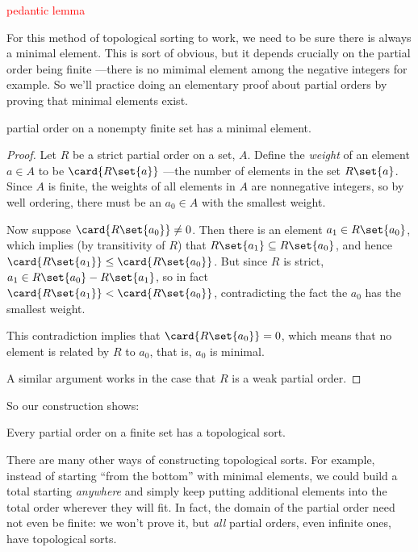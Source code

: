 \begin{editingnotes}
\textcolor{red}{pedantic lemma}

For this method of topological sorting to work, we need to be sure
there is always a minimal element.  This is sort of obvious, but it
depends crucially on the partial order being finite ---there is no
mimimal element among the negative integers for example.  So we'll
practice doing an elementary proof about partial orders by proving
that minimal elements exist.

\begin{lemma}\label{finmin}
   partial order on a nonempty finite set has
  a minimal element.

\begin{proof} Let $R$ be a strict partial order on a set, $A$.  Define the \emph{weight}
of an element $a \in A$ to be $\card{R\set{a}}$ ---the number of
elements in the set $R\set{a}$.  Since $A$ is finite, the weights of
all elements in $A$ are nonnegative integers, so by well ordering,
there must be an $a_0 \in A$ with the smallest weight.

Now suppose $\card{R\set{a_0}} \neq 0$.  Then there is an element $a_1 \in
R\set{a_0}$, which implies (by transitivity of $R$) that $R\set{a_1}
\subseteq R\set{a_0}$, and hence $\card{R\set{a_1}} \leq
\card{R\set{a_0}}$.  But since $R$ is strict, $a_1 \in R\set{a_0} -
R\set{a_1}$, so in fact $\card{R\set{a_1}} < \card{R\set{a_0}}$,
contradicting the fact the $a_0$ has the smallest weight.

This contradiction implies that $\card{R\set{a_0}} = 0$, which means that
no element is related by $R$ to $a_0$, that is, $a_0$ is minimal.

A similar argument works in the case that $R$ is a weak partial order.

\end{proof}
\end{lemma}

\end{editingnotes}

So our construction shows:

\begin{theorem}\label{thm:topological}
Every partial order on a finite set has a topological sort.
\end{theorem}

There are many other ways of constructing topological sorts.  For example,
instead of starting ``from the bottom'' with minimal elements, we could
build a total starting \emph{anywhere} and simply keep putting additional
elements into the total order wherever they will fit.  In fact, the domain
of the partial order need not even be finite: we won't prove it, but \emph{all}
partial orders, even infinite ones, have topological sorts.

